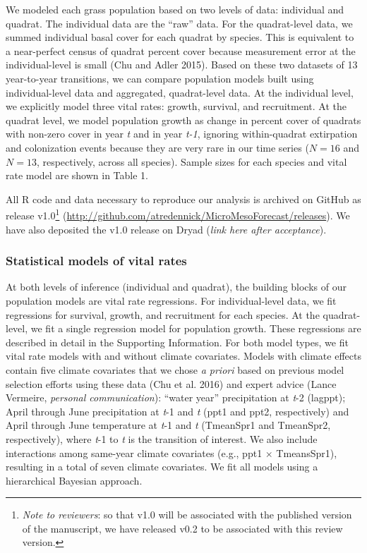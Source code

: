 \documentclass[12pt,]{article}
\let\rmarkdownfootnote\footnote%
\def\footnote{\protect\rmarkdownfootnote}
\begin{document}
We modeled each grass population based on two levels of data: individual
and quadrat. The individual data are the ``raw'' data. For the
quadrat-level data, we summed individual basal cover for each quadrat by
species. This is equivalent to a near-perfect census of quadrat percent
cover because measurement error at the individual-level is small (Chu
and Adler 2015). Based on these two datasets of 13 year-to-year
transitions, we can compare population models built using
individual-level data and aggregated, quadrat-level data. At the
individual level, we explicitly model three vital rates: growth,
survival, and recruitment. At the quadrat level, we model population
growth as change in percent cover of quadrats with non-zero cover in
year \emph{t} and in year \emph{t-1}, ignoring within-quadrat
extirpation and colonization events because they are very rare in our
time series (\(N=16\) and \(N=13\), respectively, across all species).
Sample sizes for each species and vital rate model are shown in Table 1.

All R code and data necessary to reproduce our analysis is archived on
GitHub as release v1.0\footnote{\emph{Note to reviewers}: so that v1.0
  will be associated with the published version of the manuscript, we
  have released v0.2 to be associated with this review version.}
(\url{http://github.com/atredennick/MicroMesoForecast/releases}). We
have also deposited the v1.0 release on Dryad (\emph{link here after
acceptance}).

\subsubsection{Statistical models of vital
rates}\label{statistical-models-of-vital-rates}

At both levels of inference (individual and quadrat), the building
blocks of our population models are vital rate regressions. For
individual-level data, we fit regressions for survival, growth, and
recruitment for each species. At the quadrat-level, we fit a single
regression model for population growth. These regressions are described
in detail in the Supporting Information. For both model types, we fit
vital rate models with and without climate covariates. Models with
climate effects contain five climate covariates that we chose
\emph{a priori} based on previous model selection efforts using these
data (Chu et al. 2016) and expert advice (Lance Vermeire, \emph{personal
communication}): ``water year'' precipitation at \emph{t}-2 (lagppt);
April through June precipitation at \emph{t}-1 and \emph{t} (ppt1 and
ppt2, respectively) and April through June temperature at \emph{t}-1 and
\emph{t} (TmeanSpr1 and TmeanSpr2, respectively), where \emph{t}-1 to
\emph{t} is the transition of interest. We also include interactions
among same-year climate covariates (e.g., ppt1 \(\times\) TmeansSpr1),
resulting in a total of seven climate covariates. We fit all models
using a hierarchical Bayesian approach.
\end{document}
